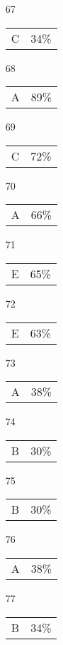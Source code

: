 \documentclass{article}
\begin{document}
\begin{multicols}{4}
\begin{enumerate}
    \item[67] \begin{tabular}{cc} C & 34\%\end{tabular}
    
    \item[68] \begin{tabular}{cc} A & 89\%\end{tabular}
    
    \item[69] \begin{tabular}{cc} C & 72\%\end{tabular}
    
    \item[70] \begin{tabular}{cc} A & 66\%\end{tabular}
    
       \item[]
    
    \item[71] \begin{tabular}{cc} E & 65\%\end{tabular}
    
    \item[72] \begin{tabular}{cc} E & 63\%\end{tabular}
    
    \item[73] \begin{tabular}{cc} A & 38\%\end{tabular}
    
    \item[74] \begin{tabular}{cc} B & 30\%\end{tabular}
    
    \item[75] \begin{tabular}{cc} B & 30\%\end{tabular}
    
       \item[]
    
    \item[76] \begin{tabular}{cc} A & 38\%\end{tabular}
    
    \item[77] \begin{tabular}{cc} B & 34\%\end{tabular}
    

\end{enumerate}
\end{multicols}
\end{document}
